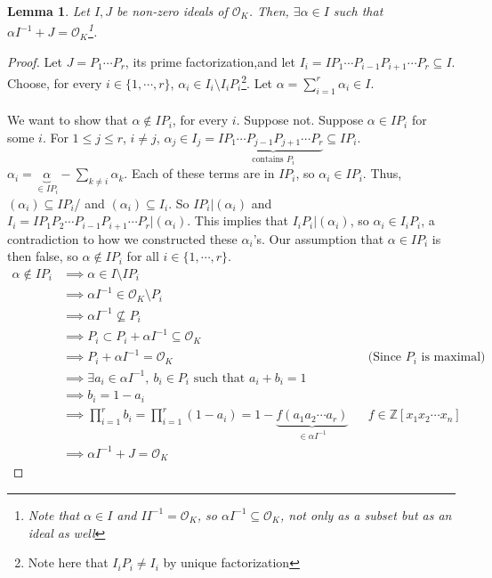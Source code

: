 \documentclass{article}
\newcommand{\air}{\mathcal{O}_K}
\newcommand{\Z}{\mathbb{Z}}
\newtheorem{lemma}{Lemma}[subsection]
\begin{document}
\begin{lemma}
Let $I,J$ be non-zero ideals of $\air$. Then, $\exists \alpha\in I$ such that $\alpha I^{-1}+J=\air$\footnote{Note that $\alpha\in I$ and $II^{-1}=\air$, so $\alpha I^{-1}\subseteq \air$, not only as a subset but as an ideal as well}. 
\end{lemma}
\begin{proof}
Let $J=P_1\cdots P_r$, its prime factorization,and let $I_i=IP_1\cdots P_{i-1}P_{i+1}\cdots P_r\subseteq I$. Choose, for every $i\in\{1,\cdots, r\}$, $\alpha_i \in I_i\setminus I_iP_i$\footnote{Note here that $I_iP_i \neq I_i$ by unique factorization}. Let $\alpha = \displaystyle\sum_{i=1}^r \alpha_i\in I$.\\
\\
We want to show that $\alpha\not\in IP_i$, for every $i$. Suppose not. Suppose $\alpha\in IP_i$ for some $i$. For $1\leq j\leq r$, $i\neq j$, $\alpha_j\in I_j=I\underbrace{P_1\cdots P_{j-1}P_{j+1}\cdots P_r}_{\text{contains $P_i$}}\subseteq IP_i$. $\alpha_i=\underbrace{\alpha}_{\in IP_i} - \sum_{k\neq i}\alpha_k$. Each of these terms are 
in $IP_i$, so $\alpha_i\in IP_i$. Thus, $(\alpha_i)\subseteq IP_i$/ and $(\alpha_i)\subseteq I_i$. So $IP_i|(\alpha_i)$ and $I_i=IP_1P_2\cdots P_{i-1}P_{i+1}\cdots P_r | (\alpha_i)$. 
This implies that $I_iP_i|(\alpha_i)$, so $\alpha_i\in I_iP_i$, a contradiction to how we constructed these $\alpha_i$'s. Our assumption that $\alpha\in IP_i$ is then false, so $\alpha\not\in IP_i$ for all $i\in\{1,\cdots, r\}$.
\begin{align*}
    \alpha\not\in IP_i&\implies \alpha\in I\setminus IP_i\\
    &\implies \alpha I^{-1}\in \air\setminus P_i\\
    &\implies \alpha I^{-1}\not\subseteq P_i\\
    &\implies P_i\subset P_i + \alpha I^{-1}\subseteq\air\\
    &\implies P_i+\alpha I^{-1}=\air &&\text{(Since $P_i$ is maximal)}\\
    &\implies \exists a_i\in \alpha I^{-1},\ b_i\in P_i\text{ such that } a_i+b_i=1\\
    &\implies b_i=1-a_i\\
    &\implies \displaystyle\prod_{i=1}^r b_i = \prod_{i=1}^r (1-a_i) = 1-\underbrace{f(a_1a_2\cdots a_r)}_{\in\alpha I^{-1}}&& f\in\Z[x_1x_2\cdots x_n]\\
    &\implies \alpha I^{-1}+J=\air
\end{align*}
\end{proof}
\end{document}
